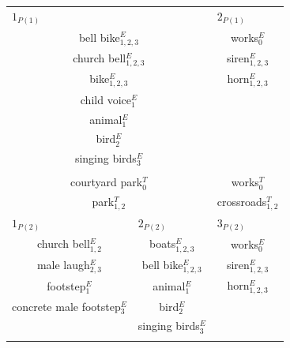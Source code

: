\begin{table}[t]
\centering
\tiny
\begin{tabular}{c|c|c|c|c|c|c}
\multicolumn{3}{l|}{$1_{P(1)}$} & \multicolumn{4}{l}{$2_{P(1)}$} \\
\multicolumn{3}{c|}{bell bike$_{1,2,3}^E$}   & \multicolumn{4}{c}{works$_0^E$} \\
\multicolumn{3}{c|}{church bell$_{1,2,3}^E$} & \multicolumn{4}{c}{siren$_{1,2,3}^E$} \\
\multicolumn{3}{c|}{bike$_{1,2,3}^E$}        & \multicolumn{4}{c}{horn$_{1,2,3}^E$} \\
\multicolumn{3}{c|}{child voice$_1^E$}       & \multicolumn{4}{c}{} \\
\multicolumn{3}{c|}{animal$_1^E$}            & \multicolumn{4}{c}{} \\          
\multicolumn{3}{c|}{bird$_2^E$}              & \multicolumn{4}{c}{} \\             
\multicolumn{3}{c|}{singing birds$_3^E$}     & \multicolumn{4}{c}{} \\  
\multicolumn{3}{c|}{}                        & \multicolumn{4}{c}{} \\
\multicolumn{3}{c|}{courtyard park$_0^T$}    & \multicolumn{4}{c}{works$_0^T$} \\                                                                     
\multicolumn{3}{c|}{park$_{1,2}^T$}          & \multicolumn{4}{c}{crossroads$_{1,2}^T$} \\                                                                                           
\hline
\multicolumn{2}{l|}{$1_{P(2)}$} & \multicolumn{1}{l|}{$2_{P(2)}$} & \multicolumn{4}{l}{$3_{P(2)}$} \\
\multicolumn{2}{c|}{church bell$_{1,2}^E$}          & boats$_{1,2,3}^E$     & \multicolumn{4}{c}{works$_0^E$} \\
\multicolumn{2}{c|}{male laugh$_{2,3}^E$}           & bell bike$_{1,2,3}^E$ & \multicolumn{4}{c}{siren$_{1,2,3}^E$} \\
\multicolumn{2}{c|}{footstep$_{1}^E$}               & animal$_{1}^E$        & \multicolumn{4}{c}{horn$_{1,2,3}^E$} \\
\multicolumn{2}{c|}{concrete male footstep$_{3}^E$} & bird$_2^E$            & \multicolumn{4}{c}{} \\	
\multicolumn{2}{c|}{}                               & singing birds$_3^E$   & \multicolumn{4}{c}{} \\	
\multicolumn{2}{c|}{}                               &                       & \multicolumn{4}{c}{} \\		

\end{tabular}
\end{table}
